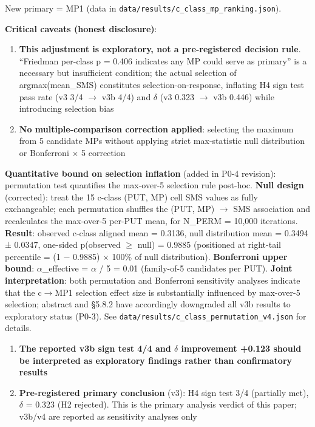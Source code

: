 \documentclass[review,12pt,authoryear]{elsarticle}
\providecommand{\tightlist}{\setlength{\itemsep}{0pt}\setlength{\parskip}{0pt}}
\begin{document}
New primary = MP1 (data in
\texttt{data/results/c\_class\_mp\_ranking.json}).

\textbf{Critical caveats (honest disclosure)}:

\begin{enumerate}
\def\labelenumi{\arabic{enumi}.}
\tightlist
\item
  \textbf{This adjustment is exploratory, not a pre-registered decision
  rule}. ``Friedman per-class p = 0.406 indicates any MP could serve as
  primary'' is a necessary but insufficient condition; the actual
  selection of argmax(mean\_SMS) constitutes selection-on-response,
  inflating H4 sign test pass rate (v3 3/4 $\to$ v3b 4/4) and $\delta$ (v3 0.323 $\to$
  v3b 0.446) while introducing selection bias
\item
  \textbf{No multiple-comparison correction applied}: selecting the
  maximum from 5 candidate MPs without applying strict max-statistic
  null distribution or Bonferroni $\times$ 5 correction
\end{enumerate}

\textbf{Quantitative bound on selection inflation} (added in P0-4
revision): permutation test quantifies the max-over-5 selection rule
post-hoc. \textbf{Null design} (corrected): treat the 15 c-class (PUT,
MP) cell SMS values as fully exchangeable; each permutation shuffles the
(PUT, MP) $\to$ SMS association and recalculates the max-over-5 per-PUT
mean, for N\_PERM = 10,000 iterations. \textbf{Result}: observed c-class
aligned mean = 0.3136, null distribution mean = 0.3494 ± 0.0347,
one-sided p(observed $\geq$ null) = 0.9885 (positioned at right-tail
percentile = (1 − 0.9885) $\times$ 100\% of null distribution).
\textbf{Bonferroni upper bound}: $\alpha$\_effective = $\alpha$ / 5 = 0.01
(family-of-5 candidates per PUT). \textbf{Joint interpretation}: both
permutation and Bonferroni sensitivity analyses indicate that the c$\to$MP1
selection effect size is substantially influenced by max-over-5
selection; abstract and §5.8.2 have accordingly downgraded all v3b
results to exploratory status (P0-3). See
\texttt{data/results/c\_class\_permutation\_v4.json} for details.

\begin{enumerate}
\def\labelenumi{\arabic{enumi}.}
\setcounter{enumi}{2}
\tightlist
\item
  \textbf{The reported v3b sign test 4/4 and $\delta$ improvement +0.123 should
  be interpreted as exploratory findings rather than confirmatory
  results}
\item
  \textbf{Pre-registered primary conclusion} (v3): H4 sign test 3/4
  (partially met), $\delta$ = 0.323 (H2 rejected). This is the primary analysis
  verdict of this paper; v3b/v4 are reported as sensitivity analyses
  only
\end{enumerate}
\end{document}
